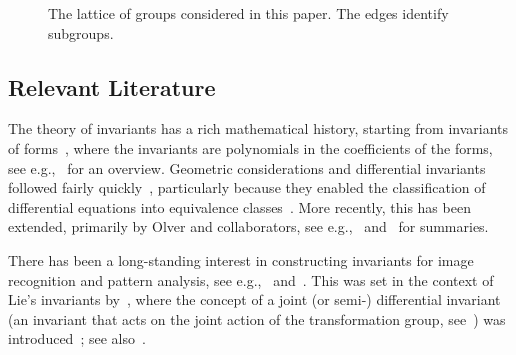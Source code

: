 \documentclass[review,onefignum,onetabnum]{siamonline190516}
\begin{document}
\begin{figure}
\begin{center}
\end{center}
\caption{The lattice of groups considered in this paper. The edges identify subgroups.}
\label{fig:lattice}
\end{figure}


\subsection{Relevant Literature}

The theory of invariants has a rich mathematical history, starting from invariants of forms~\citep{Cayley}, where the invariants are polynomials in the coefficients of the forms, see e.g.,~\citet{OlverCIT,Kraft2002} for an overview. Geometric considerations and differential invariants followed fairly quickly~\citep{Veblen1872,Tresse1894,Bouton1898,Patterson1928}, particularly because they enabled the classification of differential equations into equivalence classes~\citep{Lie1884,Littlewood44, Cartan52}. More recently, this has been extended, primarily by Olver and collaborators, see e.g.,~\citet{OlverCIT} and~\citet{OlverEIS} for summaries.

There has been a long-standing interest in constructing invariants for image recognition and pattern analysis, see e.g.,~\citet{Mundy1992} and~\citet{Wood1996}. This was set in the context of Lie's invariants by~\citet{VanGool1995}, where the concept of a joint (or semi-) differential invariant (an invariant that acts on the joint action of the transformation group, see~\citet{Fels1997,Olver2013}) was introduced~\citep{VanGool1992}; see also~\citet{Hubert2009}. 
\end{document}
